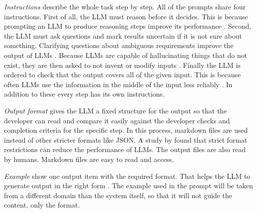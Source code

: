 \emph{Instructions} describe the whole task step by step. All of the prompts share four instructions. First of all, the LLM must reason before it decides. This is because prompting an LLM to produce reasoning steps improve its performance \parencite{weiChainOfThoughtPromptingElicits2022}. Second, the LLM must ask questions and mark results uncertain if it is not sure about something. Clarifying questions about ambiguous requirements improve the output of LLMs \parencite{muClarifyGPTFrameworkEnhancing2024}. Because LLMs are capable of hallucinating things that do not exist, they are then asked to not invent or modify inputs \parencite{huangSurveyHallucinationLarge2025}. Finally the LLM is ordered to check that the output covers all of the given input. This is because often LLMs use the information in the middle of the input less reliably \parencite{liuLostMiddleHow2024}. In addition to these every step has its own instructions.

\emph{Output format} gives the LLM a fixed structure for the output so that the developer can read and compare it easily against the developer checks and completion criteria for the specific step. In this process, markdown files are used instead of other stricter formats like JSON. A study by \textcite{tamLetMeSpeak2024} found that strict format restrictions can reduce the performance of LLMs. The output files are also read by humans. Markdown files are easy to read and access.

\emph{Example} show one output item with the required format. That helps the LLM to generate output in the right form \parencite{NEURIPS2020_1457c0d6}. The example used in the prompt will be taken from a different domain than the system itself, so that it will not guide the content, only the format.

